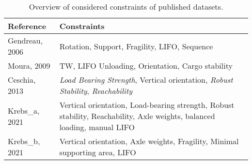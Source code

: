 \begin{table}[h]
    \centering
    \small
    \begin{tabular}{@{}lp{}@{}}
        \toprule
        \textbf{Reference} & \textbf{Constraints}                                                                                                     \\
        \midrule
        Gendreau, 2006     & Rotation, Support, Fragility, LIFO, Sequence                                                                             \\
        Moura, 2009        & TW, LIFO Unloading, Orientation, Cargo stability                                                                         \\
        Ceschia, 2013      & \textit{Load Bearing Strength}, Vertical orientation, \textit{Robust Stability}, \textit{Reachability}                   \\
        Krebs\_a, 2021     & Vertical orientation, Load-bearing strength, Robust stability, Reachability, Axle weights, balanced loading, manual LIFO \\
        Krebs\_b, 2021     & Vertical orientation, Axle weights, Fragility, Minimal supporting area, LIFO                                             \\
        \bottomrule
    \end{tabular}
    \caption{Overview of considered constraints of published datasets.}
    \label{tab:constraints_cvrp_instances}
\end{table}